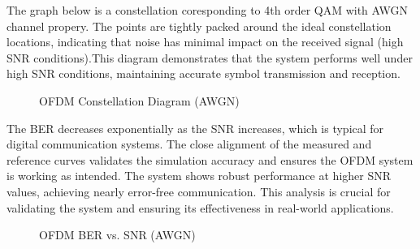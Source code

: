 \documentclass[conference]{IEEEtran}
\begin{document}
\begin{enumerate}
  The graph below is a constellation coresponding to 4th order QAM with AWGN channel propery.  The points are tightly packed around the ideal constellation locations, indicating that noise has minimal impact on the received signal (high SNR conditions).This diagram demonstrates that the system performs well under high SNR conditions, maintaining accurate symbol transmission and reception.
    
    
     \begin{figure}[H]
		\centering
    		\caption{OFDM Constellation Diagram  (AWGN) }
  	  \end{figure}
    
    The BER decreases exponentially as the SNR increases, which is typical for digital communication systems. The close alignment of the measured and reference curves validates the simulation accuracy and ensures the OFDM system is working as intended. The system shows robust performance at higher SNR values, achieving nearly error-free communication. This analysis is crucial for validating the system and ensuring its effectiveness in real-world applications.
    
    
         \begin{figure}[H]
		\centering
    		\caption{OFDM BER vs. SNR (AWGN) }
  	  \end{figure}
    


\end{enumerate}
\end{document}
